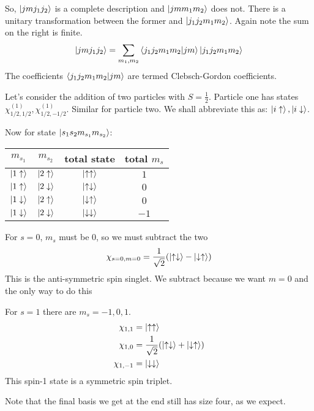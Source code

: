 So, $\ket{j m j_1 j_2}$ is a complete description and $\ket{j m m_1 m_2}$ does not. There is a unitary transformation between the former and $\ket{j_1 j_2 m_1 m_2}$.
Again note the sum on the right is finite.
\[\ket{j m j_1 j_2} = \sum_{m_1, m_2} \bra{j_1 j_2 m_1 m_2}\ket{j m} \ket{j_1 j_2 m_1 m_2} \]
The coefficients $\bra{j_1 j_2 m_1 m_2}\ket{j m}$ are termed Clebsch-Gordon coefficients.

Let's consider the addition of two particles with $S = \frac{1}{2}$. Particle one has states $\chi_{1/2, 1/2}^{(1)}, \chi_{1/2, -1/2}^{(1)}$. Similar for particle two.
We shall abbreviate this as: $\ket{i\uparrow}, \ket{i\downarrow}$.

Now for state $\ket{s_1 s_2 m_{s_1} m_{s_2}}$:

\begin{center}
\begin{tabular}{|c | c | c | c|} \hline
    $m_{s_1}$ & $m_{s_2}$ & total state & total $m_s$ \\ \hline
    $\ket{1\uparrow}$ & $\ket{2\uparrow}$ & $\ket{\uparrow \uparrow}$ & $1$ \\
    $\ket{1 \uparrow}$ & $\ket{2\downarrow}$& $\ket{\uparrow \downarrow}$ & $0$\\
    $\ket{1 \downarrow}$ & $\ket{2\uparrow}$ & $\ket{\downarrow \uparrow}$ & $0$\\
    $\ket{1 \downarrow}$ & $\ket{2\downarrow}$ & $\ket{\downarrow \downarrow}$ & $-1$\\
    \hline
\end{tabular}
\end{center}

For $s = 0$, $m_s$ must be $0$, so we must subtract the two
\[ \chi_{s = 0, m = 0} = \frac{1}{\sqrt{2}} \qty(\ket{\uparrow \downarrow} - \ket{\downarrow \uparrow}) \]
This is the anti-symmetric spin singlet. We subtract because we want $m = 0$ and the only way to do this

For $s = 1$ there are $m_s = -1, 0, 1$.
\begin{align*}
    \chi_{1, 1} &= \ket{\uparrow \uparrow} \\
    \chi_{1, 0} &= \frac{1}{\sqrt{2}} \qty(\ket{\uparrow \downarrow} + \ket{\downarrow \uparrow})\\
    \chi_{1, -1} &= \ket{\downarrow \downarrow}
\end{align*}
This spin-1 state is a symmetric spin triplet.

Note that the final basis we get at the end still has size four, as we expect.